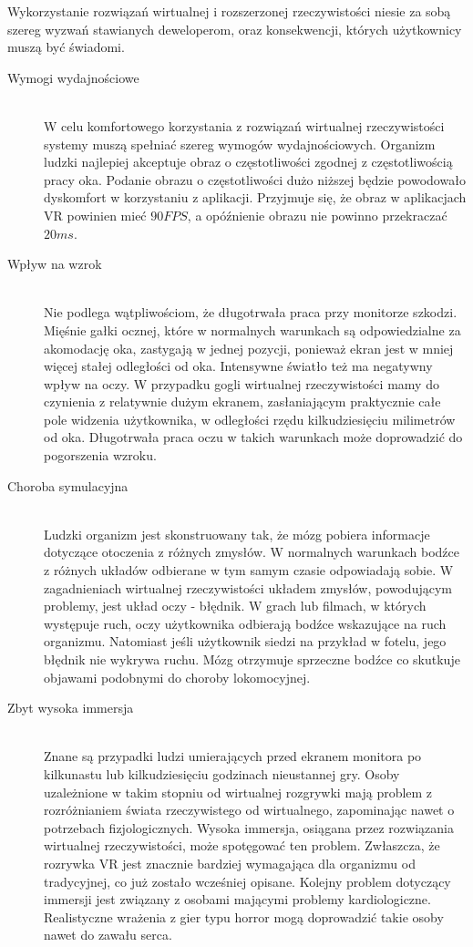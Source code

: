 \documentclass[a4paper,11pt,twoside]{report}
\theoremstyle{definition}
\begin{document}
Wykorzystanie rozwiązań wirtualnej i rozszerzonej rzeczywistości niesie za sobą szereg wyzwań stawianych deweloperom, oraz konsekwencji, których użytkownicy muszą być świadomi.

\pagebreak
\begin{description}
\item [Wymogi wydajnościowe] \hfill \\
W celu komfortowego korzystania z rozwiązań wirtualnej rzeczywistości systemy muszą spełniać szereg wymogów wydajnościowych. Organizm ludzki najlepiej akceptuje obraz o częstotliwości zgodnej z częstotliwością pracy oka. Podanie obrazu o częstotliwości dużo niższej będzie powodowało dyskomfort w korzystaniu z aplikacji. Przyjmuje się, że obraz w aplikacjach VR powinien mieć $90 FPS$, a opóźnienie obrazu nie powinno przekraczać $20 ms$.
\item [Wpływ na wzrok] \hfill \\
Nie podlega wątpliwościom, że długotrwała praca przy monitorze szkodzi. Mięśnie gałki ocznej, które w normalnych warunkach są odpowiedzialne za akomodację oka, zastygają w jednej pozycji, ponieważ ekran jest w mniej więcej stałej odległości od oka. Intensywne światło też ma negatywny wpływ na oczy. W przypadku gogli wirtualnej rzeczywistości mamy do czynienia z relatywnie dużym ekranem, zasłaniającym praktycznie całe pole widzenia użytkownika, w odległości rzędu kilkudziesięciu milimetrów od oka. Długotrwała praca oczu w takich warunkach może doprowadzić do pogorszenia wzroku.
\item [Choroba symulacyjna] \hfill \\
Ludzki organizm jest skonstruowany tak, że mózg pobiera informacje dotyczące otoczenia z różnych zmysłów. W normalnych warunkach bodźce z różnych układów odbierane w tym samym czasie odpowiadają sobie. W zagadnieniach wirtualnej rzeczywistości układem zmysłów, powodującym problemy, jest układ oczy - błędnik. W grach lub filmach, w których występuje ruch, oczy użytkownika odbierają bodźce wskazujące na ruch organizmu. Natomiast jeśli użytkownik siedzi na przykład w fotelu, jego błędnik nie wykrywa ruchu. Mózg otrzymuje sprzeczne bodźce co skutkuje objawami podobnymi do choroby lokomocyjnej.
\item [Zbyt wysoka immersja] \hfill \\
Znane są przypadki ludzi umierających przed ekranem monitora po kilkunastu lub kilkudziesięciu godzinach nieustannej gry. Osoby uzależnione w takim stopniu od wirtualnej rozgrywki mają problem z rozróżnianiem świata rzeczywistego od wirtualnego, zapominając nawet o potrzebach fizjologicznych. Wysoka immersja, osiągana przez rozwiązania wirtualnej rzeczywistości, może spotęgować ten problem. Zwłaszcza, że rozrywka VR jest znacznie bardziej wymagająca dla organizmu od tradycyjnej, co już zostało wcześniej opisane. 
Kolejny problem dotyczący immersji jest związany z osobami mającymi problemy kardiologiczne. Realistyczne wrażenia z gier typu horror mogą doprowadzić takie osoby nawet do zawału serca.
\end{description}
\end{document}
